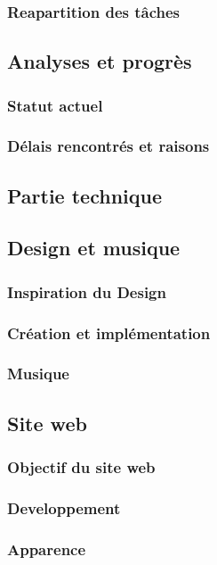 \documentclass[12pt]{article}
\begin{document}
\subsubsection{Reapartition des tâches}
% 

\subsection{Analyses et progrès}
\subsubsection{Statut actuel}
\subsubsection{Délais rencontrés et raisons}
% 

\subsection{Partie technique}

\subsection{Design et musique}
\subsubsection{Inspiration du Design}
\subsubsection{Création et implémentation}
\subsubsection{Musique}

\subsection{Site web}
\subsubsection{Objectif du site web}

\subsubsection{Developpement}
\subsubsection{Apparence}
\end{document}
